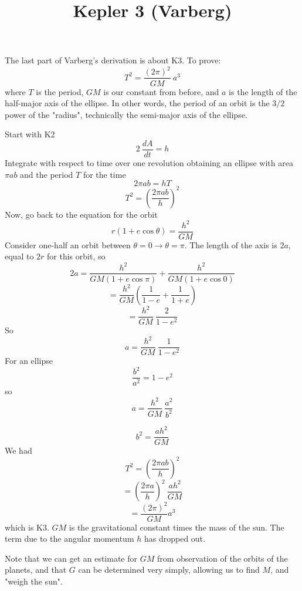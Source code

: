 \documentclass[11pt, oneside]{article}
\title{Kepler 3 (Varberg)}
\date{}
\begin{document}
\maketitle
\Large

The last part of Varberg's derivation is about K3.  To prove:
\[ T^2 = \frac{(2 \pi)^2}{GM} \ a^3 \]
where $T$ is the period, $GM$ is our constant from before, and $a$ is the length of the half-major axis of the ellipse.  In other words, the period of an orbit is the $3/2$ power of the "radius", technically the semi-major axis of the ellipse.

Start with K2
\[ 2 \ \frac{dA}{dt} =  h \]
Integrate with respect to time over one revolution obtaining an ellipse with area $\pi a b$ and the period $T$ for the time
\[ 2 \pi a b = hT \]
\[ T^2 = (\frac{2 \pi a b}{h})^2 \]
Now, go back to the equation for the orbit
\[ r(1 + e \cos \theta) = \frac{h^2}{GM} \]
Consider one-half an orbit between $\theta = 0 \rightarrow \theta = \pi$.  The length of the axis is $2a$, equal to $2r$ for this orbit, so
\[ 2a = \frac{h^2}{GM(1 + e \cos \pi)} +  \frac{h^2}{GM(1 + e \cos 0)} \]
\[ = \frac{h^2}{GM} (\frac{1}{1 - e} +  \frac{1}{1 + e}) \]
\[ = \frac{h^2}{GM} \ \frac{2}{1 - e^2} \]
So
\[ a = \frac{h^2}{GM} \ \frac{1}{1 - e^2} \]
For an ellipse
\[ \frac{b^2}{a^2} = 1 - e^2 \]
so
\[ a = \frac{h^2}{GM} \ \frac{a^2}{b^2} \]

\[  b^2 = \frac{ah^2}{GM}  \]
We had 
\[ T^2 = (\frac{2 \pi a b}{h})^2 \]
\[ = (\frac{2 \pi a }{h})^2 \  \frac{ah^2}{GM}  \]
\[ = \frac{(2 \pi)^2}{GM} a^3 \]
which is K3.  $GM$ is the gravitational constant times the mass of the sun.  The term due to the angular momentum $h$ has dropped out.

Note that we can get an estimate for $GM$ from observation of the orbits of the planets, and that $G$ can be determined very simply, allowing us to find $M$, and "weigh the sun".
\end{document}
